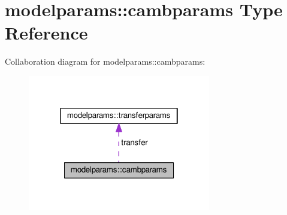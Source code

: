 \hypertarget{structmodelparams_1_1cambparams}{}\section{modelparams\+:\+:cambparams Type Reference}
\label{structmodelparams_1_1cambparams}


Collaboration diagram for modelparams\+:\+:cambparams\+:
\nopagebreak
\begin{figure}[H]
\begin{center}
\leavevmode
\includegraphics[width=226pt]{structmodelparams_1_1cambparams__coll__graph}
\end{center}
\end{figure}
